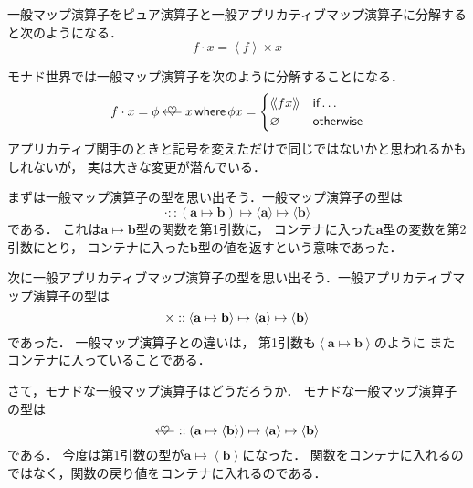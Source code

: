 \documentclass[a5paper,draft]{jsbook}
\newcommand{\mathTypeParameter}[1]{\mathbf{#1}}
\newcommand{\mathPureWith}[1]{\left\langle#1\right\rangle}
\newcommand{\mathUnitWith}[1]{\left\langle\!\left\langle#1\right\rangle\!\right\rangle}
\newcommand{\mathPureNothing}{\varnothing}
\newcommand{\mathApplicativeGeneralMap}{\mathbin{\times}}
\newcommand{\mathBind}{\mathbin{\ooalign{$\longleftarrow$\crcr\hss$\heartsuit$\hss}}}
\newcommand{\mathGeneralMap}{\mathbin{\cdot}}
\newcommand{\mathIn}{\mathrel{::}}
\newcommand{\mathMapsTo}{\mapsto}
\newcommand{\mathKeyword}[1]{\operatorname{\textsf{#1}}}
\newcommand{\mathIf}{\mathKeyword{if}}
\newcommand{\mathOtherwise}{\mathKeyword{otherwise}}
\newcommand{\mathWhere}{\mathKeyword{where}}
\newcommand{\mathMorph}[2]{#1\mathMapsTo#2}
\newcommand{\mathMorphII}[3]{#1\mathMapsTo#2\mathMapsTo#3}
\begin{document}
一般マップ演算子をピュア演算子と一般アプリカティブマップ演算子に分解すると次のようになる．
\begin{equation}
f\mathGeneralMap x=\mathPureWith{f}\mathApplicativeGeneralMap x
\end{equation}

モナド世界では一般マップ演算子を次のように分解することになる．
\begin{equation}
f\mathGeneralMap x=\phi\mathBind x
\mathWhere
\phi x=\begin{cases}
\mathUnitWith{fx}&\mathIf\dots\\
\mathPureNothing&\mathOtherwise
\end{cases}
\end{equation}
アプリカティブ関手のときと記号を変えただけで同じではないかと思われるかもしれないが，
実は大きな変更が潜んでいる．

まずは一般マップ演算子の型を思い出そう．一般マップ演算子の型は
\begin{equation}
\mathGeneralMap
\mathIn{}\mathMorphII{(\mathMorph{\mathTypeParameter{a}}{\mathTypeParameter{b}})}{\langle\mathTypeParameter{a}\rangle}{\langle\mathTypeParameter{b}\rangle}
\end{equation}
である．
これは$\mathTypeParameter{a}\mapsto\mathTypeParameter{b}$型の関数を第1引数に，
コンテナに入った$\mathTypeParameter{a}$型の変数を第2引数にとり，
コンテナに入った$\mathTypeParameter{b}$型の値を返すという意味であった．

次に一般アプリカティブマップ演算子の型を思い出そう．一般アプリカティブマップ演算子の型は
\begin{equation}
\mathApplicativeGeneralMap
\mathIn{}\mathMorphII{\langle\mathMorph{\mathTypeParameter{a}}{\mathTypeParameter{b}}\rangle}{\langle\mathTypeParameter{a}\rangle}{\langle\mathTypeParameter{b}\rangle}\\
\end{equation}
であった．
一般マップ演算子との違いは，
第1引数も$\mathPureWith{\mathTypeParameter{a}\mapsto\mathTypeParameter{b}}$のように
またコンテナに入っていることである．

さて，モナドな一般マップ演算子はどうだろうか．
モナドな一般マップ演算子の型は
\begin{equation}
\mathBind
\mathIn{}\mathMorphII{(\mathMorph{\mathTypeParameter{a}}{\langle\mathTypeParameter{b}\rangle})}{\langle\mathTypeParameter{a}\rangle}{\langle{\mathTypeParameter{b}}\rangle}
\end{equation}
である．
今度は第1引数の型が$\mathTypeParameter{a}\mapsto\mathPureWith{\mathTypeParameter{b}}$になった．
関数をコンテナに入れるのではなく，関数の戻り値をコンテナに入れるのである．
\end{document}
